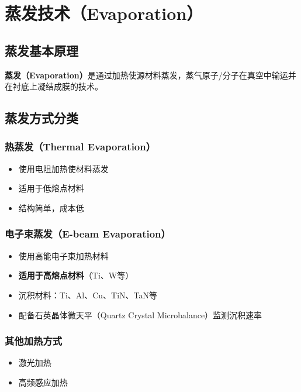 \documentclass[UTF8,12pt,a4paper]{ctexart}
\begin{document}
\section{蒸发技术（Evaporation）}

\subsection{蒸发基本原理}

\textbf{蒸发（Evaporation）}是通过加热使源材料蒸发，蒸气原子/分子在真空中输运并在衬底上凝结成膜的技术。

\subsection{蒸发方式分类}

\subsubsection{热蒸发（Thermal Evaporation）}

\begin{itemize}
    \item 使用电阻加热使材料蒸发
    \item 适用于低熔点材料
    \item 结构简单，成本低
\end{itemize}

\subsubsection{电子束蒸发（E-beam Evaporation）}

\begin{itemize}
    \item 使用高能电子束加热材料
    \item \textbf{适用于高熔点材料}（Ti、W等）
    \item 沉积材料：Ti、Al、Cu、TiN、TaN等
    \item 配备石英晶体微天平（Quartz Crystal Microbalance）监测沉积速率
\end{itemize}

\subsubsection{其他加热方式}

\begin{itemize}
    \item 激光加热
    \item 高频感应加热
\end{itemize}
\end{document}
